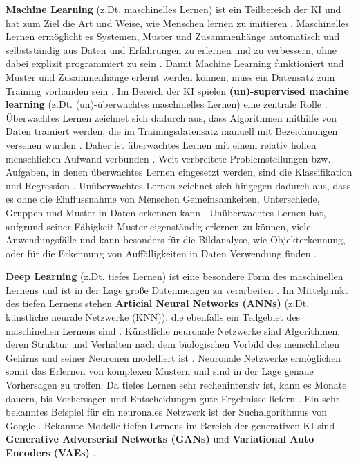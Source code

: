 \textbf{Machine Learning} (z.Dt. maschinelles Lernen) ist ein Teilbereich der KI \cite{machine-learning-big-data-insider} und hat zum Ziel die Art und Weise, wie Menschen lernen zu imitieren \cite{ai-ml-dl}.
Maschinelles Lernen ermöglicht es Systemen, Muster und Zusammenhänge automatisch und selbstständig aus Daten und Erfahrungen zu erlernen und zu verbessern, ohne dabei explizit programmiert zu sein \cite{machine-learning-data-absolut}.
Damit Machine Learning funktioniert und Muster und Zusammenhänge erlernt werden können, muss ein Datensatz zum Training vorhanden sein \cite{machine-learning-data-absolut}.
Im Bereich der KI spielen \textbf{(un)-supervised machine learning} (z.Dt. (un)-überwachtes maschinelles Lernen) eine zentrale Rolle \cite{machine-learning-big-data-insider}.
Überwachtes Lernen zeichnet sich dadurch aus, dass Algorithmen mithilfe von Daten trainiert werden, die im Trainingsdatensatz manuell mit Bezeichnungen versehen wurden \cite{machine-learning-data-absolut}.
Daher ist überwachtes Lernen mit einem relativ hohen menschlichen Aufwand verbunden \cite{machine-learning-data-absolut}.
Weit verbreitete Problemstellungen bzw. Aufgaben, in denen überwachtes Lernen eingesetzt werden, sind die Klassifikation und Regression \cite{machine-learning-algorithms-quick-review}.
Unüberwachtes Lernen zeichnet sich hingegen dadurch aus, dass es ohne die Einflussnahme von Menschen Gemeinsamkeiten, Unterschiede, Gruppen und Muster in Daten erkennen kann \cite{machine-learning-data-absolut}.
Unüberwachtes Lernen hat, aufgrund seiner Fähigkeit Muster eigenständig erlernen zu können, viele Anwendungsfälle und kann besonders für die Bildanalyse, wie Objekterkennung, oder für die Erkennung von Auffälligkeiten in Daten Verwendung finden \cite{machine-learning-ibm}.

\textbf{Deep Learning} (z.Dt. tiefes Lernen) ist eine besondere Form des maschinellen Lernens und ist in der Lage große Datenmengen zu verarbeiten \cite{deep-learning-ibm}.
Im Mittelpunkt des tiefen Lernens stehen \textbf{Articial Neural Networks (ANNs)} (z.Dt. künstliche neurale Netzwerke (KNN)), die ebenfalls ein Teilgebiet des maschinellen Lernens sind \cite{ibm-ai-ml-dl}.
Künstliche neuronale Netzwerke sind Algorithmen, deren Struktur und Verhalten nach dem biologischen Vorbild des menschlichen Gehirns und seiner Neuronen modelliert ist \cite{deep-learning-ibm,deep-learning-data-absolut}.
Neuronale Netzwerke ermöglichen somit das Erlernen von komplexen Mustern und sind in der Lage genaue Vorhersagen zu treffen.
Da tiefes Lernen sehr rechenintensiv ist, kann es Monate dauern, bis Vorhersagen und Entscheidungen gute Ergebnisse liefern \cite{deep-learning-data-absolut}.
Ein sehr bekanntes Beispiel für ein neuronales Netzwerk ist der Suchalgorithmus von Google \cite{ibm-ai-ml-dl}.
Bekannte Modelle tiefen Lernens im Bereich der generativen KI sind \textbf{Generative Adverserial Networks (GANs)} \cite{goodfellow-gan} und \textbf{Variational Auto Encoders (VAEs)} \cite{kigma-vaes}.

